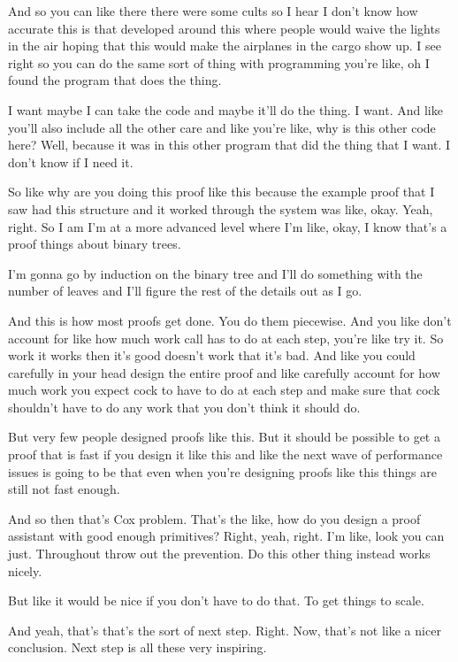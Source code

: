 And so you can like there there were some cults so I hear I don't know how accurate this is that developed around this where people would waive the lights in the air hoping that this would make the airplanes in the cargo show up. I see right so you can do the same sort of thing with programming you're like, oh I found the program that does the thing. 

I want maybe I can take the code and maybe it'll do the thing. I want. And like you'll also include all the other care and like you're like, why is this other code here? Well, because it was in this other program that did the thing that I want. I don't know if I need it. 

So like why are you doing this proof like this because the example proof that I saw had this structure and it worked through the system was like, okay. Yeah, right. So I am I'm at a more advanced level where I'm like, okay, I know that's a proof things about binary trees. 

I'm gonna go by induction on the binary tree and I'll do something with the number of leaves and I'll figure the rest of the details out as I go. 

And this is how most proofs get done. You do them piecewise. And you like don't account for like how much work call has to do at each step, you're like try it. So work it works then it's good doesn't work that it's bad. And like you could carefully in your head design the entire proof and like carefully account for how much work you expect cock to have to do at each step and make sure that cock shouldn't have to do any work that you don't think it should do. 

But very few people designed proofs like this. But it should be possible to get a proof that is fast if you design it like this and like the next wave of performance issues is going to be that even when you're designing proofs like this things are still not fast enough. 

And so then that's Cox problem. That's the like, how do you design a proof assistant with good enough primitives? Right, yeah, right. I'm like, look you can just. Throughout throw out the prevention. Do this other thing instead works nicely. 

But like it would be nice if you don't have to do that. To get things to scale. 

And yeah, that's that's the sort of next step. Right. Now, that's not like a nicer conclusion. Next step is all these very inspiring. 

